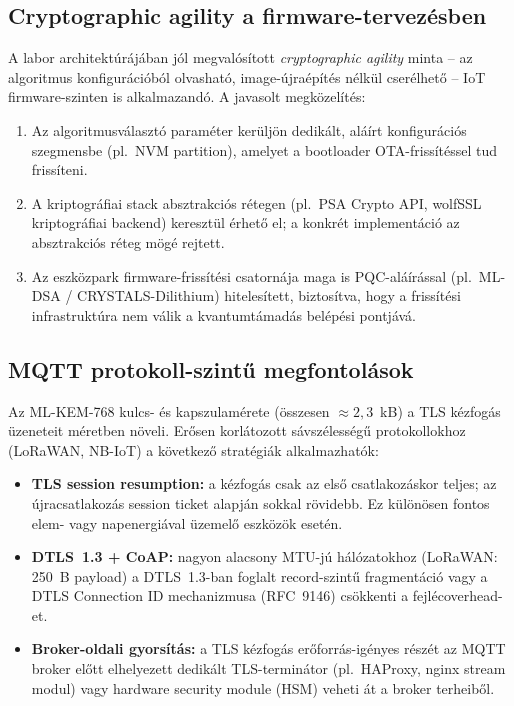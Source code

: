 \subsection{Cryptographic agility a firmware-tervezésben}

A labor architektúrájában jól megvalósított \emph{cryptographic agility} minta -- az
algoritmus konfigurációból olvasható, image-újraépítés nélkül cserélhető -- IoT
firmware-szinten is alkalmazandó. A javasolt megközelítés:
\begin{enumerate}
    \item Az algoritmusválasztó paraméter kerüljön dedikált, aláírt konfigurációs
          szegmensbe (pl.\ NVM partition), amelyet a bootloader OTA-frissítéssel tud
          frissíteni.
    \item A kriptográfiai stack absztrakciós rétegen (pl.\ PSA Crypto API, wolfSSL
          kriptográfiai backend) keresztül érhető el; a konkrét implementáció az
          absztrakciós réteg mögé rejtett.
    \item Az eszközpark firmware-frissítési csatornája maga is PQC-aláírással (pl.\
          ML-DSA / CRYSTALS-Dilithium) hitelesített, biztosítva, hogy a frissítési
          infrastruktúra nem válik a kvantumtámadás belépési pontjává.
\end{enumerate}

\subsection{MQTT protokoll-szintű megfontolások}

Az ML-KEM-768 kulcs- és kapszulamérete (összesen $\approx 2{,}3$~kB) a TLS kézfogás
üzeneteit méretben növeli. Erősen korlátozott sávszélességű protokollokhoz (LoRaWAN,
NB-IoT) a következő stratégiák alkalmazhatók:
\begin{itemize}
    \item \textbf{TLS session resumption:} a kézfogás csak az első csatlakozáskor teljes;
          az újracsatlakozás session ticket alapján sokkal rövidebb. Ez különösen fontos
          elem- vagy napenergiával üzemelő eszközök esetén.
    \item \textbf{DTLS~1.3 + CoAP:} nagyon alacsony MTU-jú hálózatokhoz (LoRaWAN:
          250~B payload) a DTLS~1.3-ban foglalt record-szintű fragmentáció vagy a
          DTLS Connection ID mechanizmusa (RFC~9146) csökkenti a fejlécoverhead-et.
    \item \textbf{Broker-oldali gyorsítás:} a TLS kézfogás erőforrás-igényes részét
          az MQTT broker előtt elhelyezett dedikált TLS-terminátor (pl.\ HAProxy,
          nginx stream modul) vagy hardware security module (HSM) veheti át a broker
          terheiből.
\end{itemize}

